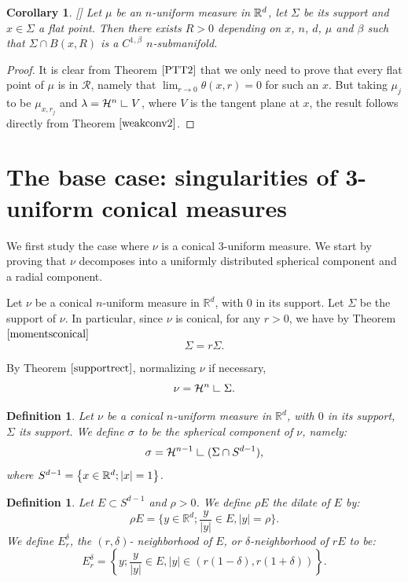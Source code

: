 \documentclass[11pt]{article}
\newtheorem{definition}[theorem]{Definition}
\newtheorem{corollary}[theorem]{Corollary}
\theoremstyle{definition}
\theoremstyle{remark}
\numberwithin{equation}{section}
\newcommand{\res}{\hbox{{\vrule height .22cm}{\leaders\hrule\hskip .2cm}}}
\def\res{\hbox{ {\vrule height .22cm}{\leaders\hrule\hskip.2cm} } }
\begin{document}
\begin{corollary}\label{consPTT2}[\cite{PTT}]
Let $\mu$ be an $n$-uniform measure in $\mathbb{R}^{d}$, let $\Sigma$ be its support and $x \in \Sigma$ a flat point. Then there exists $R >0$ depending on $x$, $n$, $d$, $\mu$ and $\beta$  such that $\Sigma \cap B(x,R)$ is a $C^{1,\beta}$ $n$-submanifold.
\end{corollary}
\begin{proof}
It is clear from Theorem $\ref{PTT2}$ that we only need to prove that every flat point of $\mu$ is in $\mathcal{R}$, namely that $\lim_{r \to 0} \theta(x,r) =0$ for such an $x$. 
But taking $\mu_{j}$ to be $\mu_{x,r_j}$ and $\lambda= \mathcal{H}^{n} \res V$, where $V$ is the tangent plane at $x$, the result follows directly from Theorem $\ref{weakconv2}$.
\end{proof}

 

\newpage
\section{The base case: singularities of 3-uniform conical measures}
We first study the case where $\nu$ is a conical $3$-uniform measure. 
We start by proving that $\nu$ decomposes into a uniformly distributed spherical component and a radial component. 

Let $\nu$ be a conical $n$-uniform measure in $\mathbb{R}^d$, with $0$ in its support. Let $\Sigma$ be the support of $\nu$. 
In particular, since $\nu$ is conical, for any $r>0$, we have by Theorem $\ref{momentsconical}$
$$\Sigma = r \Sigma.$$

By Theorem $\ref{supportrect}$, normalizing $\nu$ if necessary,
 $$\nu= \mathcal{H}^n \res \Sigma.$$

\begin{definition}
Let $\nu$ be a conical $n$-uniform measure in $\mathbb{R}^d$, with $0$ in its support, $\Sigma$ its support.
We define $\sigma$ to be the spherical component of $\nu$, namely:
$$\sigma = \mathcal{H}^{n-1} \res ({\Sigma \cap {S^{d-1}}}),$$
where $S^{d-1}= \left\lbrace x \in \mathbb{R}^{d} ; |x|=1 \right\rbrace$.
\end{definition}





\begin{definition}  Let $E \subset S^{d-1}$ and $\rho>0$. We define $\rho E$ the dilate of $E$ by: $$ \rho E = \{y \in \mathbb{R}^d ; \frac{y}{|y|} \in E, |y|= \rho \}. $$
We define $E_{r}^{\delta}$, the $(r,\delta)$- neighborhood of $E$, or $\delta$-neighborhood of $r E$  to be: 
\begin{equation} \label{polarnhood} E_{r}^{\delta} = \left\lbrace y; \frac{y}{|y|} \in E, |y| \in (r(1-\delta), r(1+\delta)) \right\rbrace. 
\end{equation} \end{definition}
\end{document}
